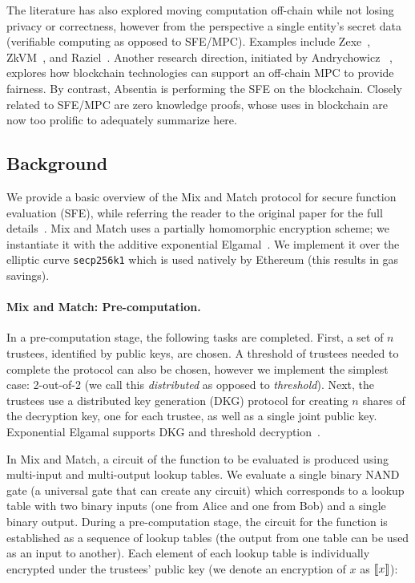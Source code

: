 
The literature has also explored moving computation off-chain while not losing privacy or correctness, however from the perspective a single entity's secret data (\ie verifiable computing as opposed to SFE/MPC). Examples include Zexe~\cite{bowe2020zexe}, ZkVM~\cite{zkvm}, and Raziel~\cite{sanchez2018raziel}. Another research direction, initiated by Andrychowicz \etal~\cite{andrychowicz2014secure}, explores how blockchain technologies can support an off-chain MPC to provide fairness. By contrast, Absentia is performing the SFE on the blockchain. Closely related to SFE/MPC are zero knowledge proofs, whose uses in blockchain are now too prolific to adequately summarize here.




\subsection{Background}

We provide a basic overview of the Mix and Match protocol for secure function evaluation (SFE), while referring the reader to the original paper for the full details~\cite{JJ00}. Mix and Match uses a partially homomorphic encryption scheme; we instantiate it with the additive exponential Elgamal~\cite{CGS97}. We implement it over the elliptic curve \texttt{secp256k1} which is used natively by Ethereum (this results in gas savings).

\paragraph{Mix and Match: Pre-computation.} 

In a pre-computation stage, the following tasks are completed. First, a set of $n$ trustees, identified by public keys, are chosen. A threshold of trustees needed to complete the protocol can also be chosen, however we implement the simplest case: 2-out-of-2 (we call this \emph{distributed} as opposed to \emph{threshold}). Next, the trustees use a distributed key generation (DKG) protocol for creating $n$ shares of the decryption key, one for each trustee, as well as a single joint public key. Exponential Elgamal supports DKG and threshold decryption~\cite{Ped91a}.

In Mix and Match, a circuit of the function to be evaluated is produced using multi-input and multi-output lookup tables. We evaluate a single binary NAND gate (a universal gate that can create any circuit) which corresponds to a lookup table with two binary inputs (one from Alice and one from Bob) and a single binary output. During a pre-computation stage, the circuit for the function is established as a sequence of lookup tables (the output from one table can be used as an input to another). Each element of each lookup table is individually encrypted under the trustees' public key (we denote an encryption of $x$ as $\llbracket x \rrbracket$):

